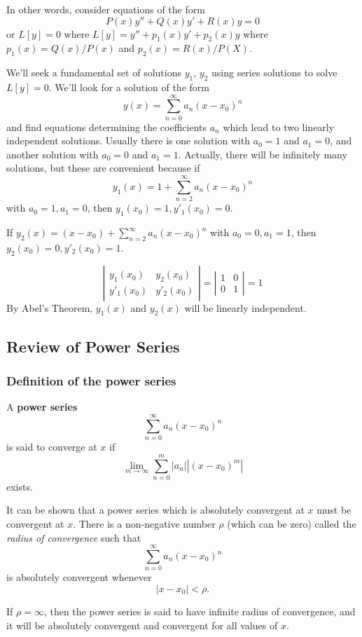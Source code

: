 \documentclass[11pt]{article}
\newcommand{\sumseries}{\sum_{n=0}^{\infty}}
\newcommand{\sumseriestwo}{\sum_{n=2}^{\infty}}
\newcommand{\powerser}{(x - x_0)^n}
\begin{document}
	In other words, consider equations of the form
		$$ P(x) y'' + Q(x) y' + R(x) y = 0 $$
	or $L[y]= 0$ where $L[y] = y'' + p_1(x) y' + p_2(x) y$ where $p_1(x) = Q(x) / P(x)$ and $p_2 (x) = R(x) / P(X)$.

	We'll seek a fundamental set of solutions $y_1$, $y_2$ using series solutions to solve $L[y] = 0$. We'll look for a solution of the form
		$$ y(x) = \sum_{n = 0}^{\infty} a_n (x - x_0)^n $$
	and find equations determining the coefficients $a_n$ which lead to two linearly independent solutions. Usually there is one solution with $a_0 = 1$ and $a_1 = 0$, and another solution with $a_0 = 0$ and $a_1 = 1$. Actually, there will be infinitely many solutions, but these are convenient because if
		$$ y_1 (x) = 1 + \sum_{n=2}^{\infty} a_n \powerser $$
	with $a_0 = 1, a_1 = 0$, then $y_1(x_0) = 1, y'_1 (x_0) = 0$.

	If $y_2 (x) = (x - x_0) + \sumseriestwo a_n \powerser$ with $a_0 = 0, a_1 = 1$, then $y_2 (x_0) = 0, y'_2(x_0) = 1$.

		$$ \left| \begin{array}{cc} y_1 (x_0) & y_2 (x_0) \\
				y'_1 (x_0) & y'_2 (x_0) \end{array} \right|
			= \left| \begin{array}{cc} 1 & 0 \\ 0 & 1 \end{array} \right| = 1 $$
	By Abel's Theorem, $y_1 (x)$ and $y_2 (x)$ will be linearly independent.

\subsection{Review of Power Series}
\subsubsection{Definition of the power series}
	A \textbf{power series}
		$$ \sumseries a_n \powerser $$
	is said to converge at $x$ if
		$$ \lim_{m \to \infty} \sum_{n = 0}^m |a_n| |(x-x_0)^m| $$
	exists.

	It can be shown that a power series which is absolutely convergent at $x$ must be convergent at $x$. There is a non-negative number $\rho$ (which can be zero) called the \emph{radius of convergence} such that
		$$ \sumseries a_n \powerser $$
	is absolutely convergent whenever
		$$ |x - x_0| < \rho. $$

	If $\rho = \infty$, then the power series is said to have infinite radius of convergence, and it will be absolutely convergent and convergent for all values of $x$.
\end{document}
